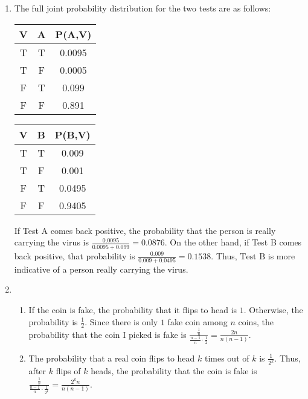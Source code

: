 \documentclass[10pt,letterpaper]{article}
\begin{document}
\begin{enumerate}
	\item The full joint probability distribution for the two tests are as follows:

		\begin{table}[!h]
			\centering
			\begin{tabular}{|c|c|c|} \hline
				{\bf V} & {\bf A} & {\bf P(A,V)} \\ \hline\hline
				T & T & 0.0095 \\ \hline
				T & F & 0.0005 \\ \hline
				F & T & 0.099  \\ \hline
				F & F & 0.891  \\ \hline
			\end{tabular}
			\hspace{1cm}
			\begin{tabular}{|c|c|c|} \hline
				{\bf V} & {\bf B} & {\bf P(B,V)} \\ \hline\hline
				T & T & 0.009  \\ \hline
				T & F & 0.001  \\ \hline
				F & T & 0.0495 \\ \hline
				F & F & 0.9405 \\ \hline
			\end{tabular}
		\end{table}

		If Test A comes back positive, the probability that the person is
		really carrying the virus is $\frac{0.0095}{0.0095+0.099} = 0.0876$. On
		the other hand, if Test B comes back positive, that probability is
		$\frac{0.009}{0.009+0.0495} = 0.1538$. Thus, $\boxed{\text{Test B}}$ is
		more indicative of a person really carrying the virus.

	\item
		\begin{enumerate}
			\item If the coin is fake, the probability that it flips to head is
				$1$. Otherwise, the probability is $\frac12$. Since there is
				only $1$ fake coin among $n$ coins, the probability that the
				coin I picked is fake is
				$\frac{\frac{1}{n}}{\frac{n-1}{n}\cdot\frac12}
				= \boxed{\frac{2n}{n(n-1)}}$.
			\item The probability that a real coin flips to head $k$ times out
				of $k$ is $\frac{1}{2^k}$. Thus, after $k$ flips of $k$ heads,
				the probability that the coin is fake is
				$\frac{\frac{1}{n}}{\frac{n-1}{n}\cdot\frac{1}{2^k}}
				= \boxed{\frac{2^kn}{n(n-1)}}$.
		\end{enumerate}
\end{enumerate}
\end{document}
